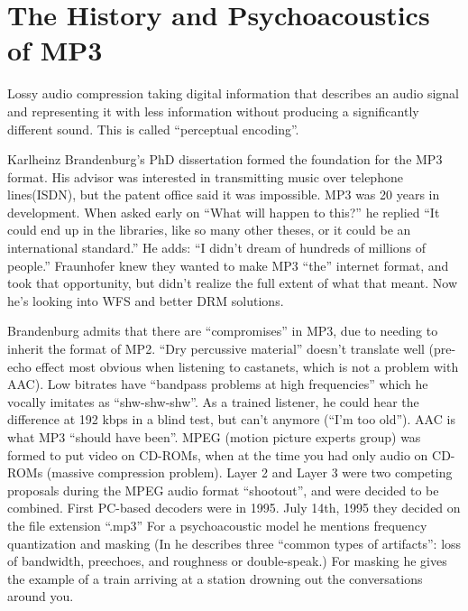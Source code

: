 \documentclass{thesis}
\begin{document}
\section{The History and Psychoacoustics of MP3}
Lossy audio compression taking digital information that describes an audio signal and representing it with less information without producing a significantly different sound. This is called ``perceptual encoding''.

	\cite{Ruckert05}
Karlheinz Brandenburg's PhD dissertation formed the foundation for the MP3 format. His advisor was interested in transmitting music over telephone lines(ISDN), but the patent office said it was impossible. MP3 was 20 years in development. When asked early on ``What will happen to this?'' he replied ``It could end up in the libraries, like so many other theses, or it could be an international standard.'' He adds: ``I didn't dream of hundreds of millions of people.'' Fraunhofer knew they wanted to make MP3 ``the'' internet format, and took that opportunity, but didn't realize the full extent of what that meant. Now he's looking into WFS and better DRM solutions.\cite{brandenburg_interviews_2004}
	
Brandenburg admits that there are ``compromises'' in MP3, due to needing to inherit the format of MP2. ``Dry percussive material'' doesn't translate well (pre-echo effect most obvious when listening to castanets, which is not a problem with AAC). Low bitrates have ``bandpass problems at high frequencies'' which he vocally imitates as ``shw-shw-shw''. As a trained listener, he could hear the difference at 192 kbps in a blind test, but can't anymore (``I'm too old''). AAC is what MP3 ``should have been''. MPEG (motion picture experts group) was formed to put video on CD-ROMs, when at the time you had only audio on CD-ROMs (massive compression problem). Layer 2 and Layer 3 were two competing proposals during the MPEG audio format ``shootout'', and were decided to be combined. First PC-based decoders were in 1995. July 14th, 1995 they decided on the file extension ``.mp3'' For a psychoacoustic model he mentions frequency quantization and masking (In \cite{karlheinz_brandenburg_mp3_????} he describes three ``common types of artifacts'': loss of bandwidth, preechoes, and roughness or double-speak.) For masking he gives the example of a train arriving at a station drowning out the conversations around you.
\end{document}
